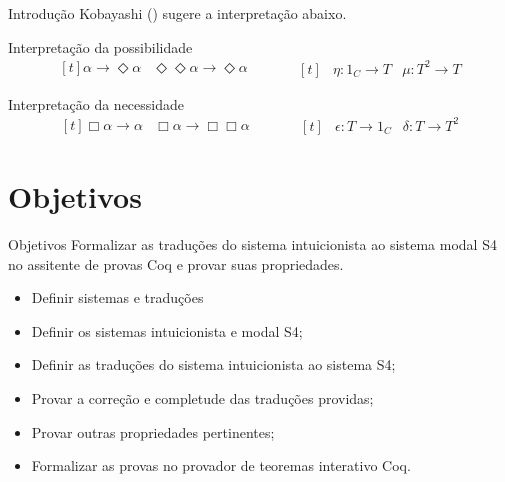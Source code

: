 \documentclass[table]{beamer}
\def\\{}%
\begin{document}
    \begin{frame}{Introdução}
        \justifying{}
        Kobayashi (\citeyear{Kobayashi}) sugere a interpretação abaixo.
        \begin{block}{Interpretação da possibilidade}
            \begin{equation*}
            \begin{aligned}[t]
                \alpha\to\Diamond\alpha& \\
                \Diamond\Diamond\alpha\to\Diamond\alpha&
            \end{aligned}
            \qquad
            \begin{aligned}[t]
                &\eta\mathrel{\colon}1_{C}\to T\\
                &\mu\mathrel{\colon}T^2\to T
            \end{aligned}
            \end{equation*}
        \end{block}

        \begin{block}{Interpretação da necessidade}
            \begin{equation*}
            \begin{aligned}[t]
                \Box\alpha\to\alpha& \\
                \Box\alpha\to\Box\Box\alpha&
            \end{aligned}
            \qquad
            \begin{aligned}[t]
                &\epsilon\mathrel{\colon}T\to 1_{C}\\
                &\delta\mathrel{\colon}T\to T^2
            \end{aligned}
            \end{equation*}
        \end{block}
    \end{frame}

    \section[]{Objetivos}
    \begin{frame}{Objetivos}
        Formalizar as traduções do sistema intuicionista ao sistema modal S4 no assitente de provas Coq e provar suas propriedades.
        \begin{itemize}
            \justifying{}
            \item Definir sistemas e traduções
            \item Definir os sistemas intuicionista e modal S4;
            \item Definir as traduções do sistema intuicionista ao sistema S4;
            \item Provar a correção e completude das traduções providas;
            \item Provar outras propriedades pertinentes;
            \item Formalizar as provas no provador de teoremas interativo Coq.
        \end{itemize}
    \end{frame}
\end{document}
